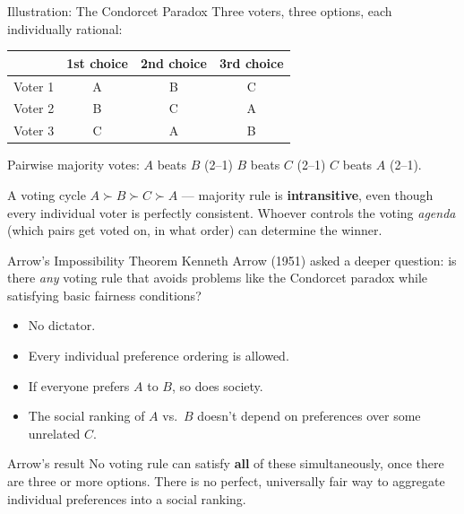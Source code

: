 \documentclass[11pt,aspectratio=169]{beamer}
\begin{document}
\begin{frame}{Illustration: The Condorcet Paradox}
  Three voters, three options, each individually rational:
  \begin{center}
  \begin{tabular}{@{}lccc@{}}
    \toprule
    & \textbf{1st choice} & \textbf{2nd choice} & \textbf{3rd choice} \\
    \midrule
    Voter 1 & A & B & C \\
    Voter 2 & B & C & A \\
    Voter 3 & C & A & B \\
    \bottomrule
  \end{tabular}
  \end{center}
  \vspace{0.5em}
  Pairwise majority votes: $A$ beats $B$ (2--1) \quad $B$ beats $C$ (2--1) \quad $C$ beats $A$ (2--1).
  \begin{alertblock}{A voting cycle}
    $A \succ B \succ C \succ A$ --- majority rule is \textbf{intransitive}, even though every individual voter is perfectly consistent. Whoever controls the voting \emph{agenda} (which pairs get voted on, in what order) can determine the winner.
  \end{alertblock}
\end{frame}

\begin{frame}{Arrow's Impossibility Theorem}
  Kenneth Arrow (1951) asked a deeper question: is there \emph{any} voting rule that avoids problems like the Condorcet paradox while satisfying basic fairness conditions?
  \begin{itemize}
    \item No dictator.
    \item Every individual preference ordering is allowed.
    \item If everyone prefers $A$ to $B$, so does society.
    \item The social ranking of $A$ vs.\ $B$ doesn't depend on preferences over some unrelated $C$.
  \end{itemize}
  \begin{alertblock}{Arrow's result}
    No voting rule can satisfy \textbf{all} of these simultaneously, once there are three or more options. There is no perfect, universally fair way to aggregate individual preferences into a social ranking.
  \end{alertblock}
\end{frame}

\end{document}
